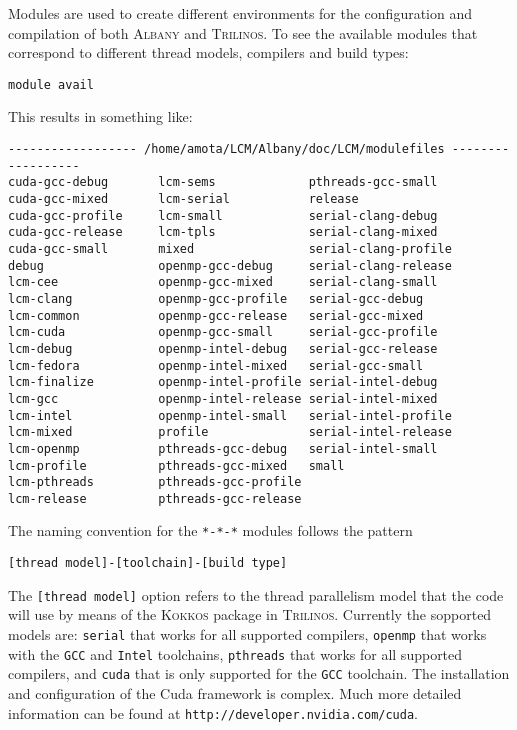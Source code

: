 \documentclass{article}
\newcommand{\trilinos}{\textsc{Trilinos}}
\newcommand{\albany}{\textsc{Albany}}
\newcommand{\kokkos}{\textsc{Kokkos}}
\begin{document}
Modules are used to create different environments for the
configuration and compilation of both \albany{} and \trilinos{}. To
see the available modules that correspond to different thread models,
compilers and build types:
\begin{verbatim}
module avail
\end{verbatim}
This results in something like:
\begin{verbatim}
------------------ /home/amota/LCM/Albany/doc/LCM/modulefiles ------------------
cuda-gcc-debug       lcm-sems             pthreads-gcc-small
cuda-gcc-mixed       lcm-serial           release
cuda-gcc-profile     lcm-small            serial-clang-debug
cuda-gcc-release     lcm-tpls             serial-clang-mixed
cuda-gcc-small       mixed                serial-clang-profile
debug                openmp-gcc-debug     serial-clang-release
lcm-cee              openmp-gcc-mixed     serial-clang-small
lcm-clang            openmp-gcc-profile   serial-gcc-debug
lcm-common           openmp-gcc-release   serial-gcc-mixed
lcm-cuda             openmp-gcc-small     serial-gcc-profile
lcm-debug            openmp-intel-debug   serial-gcc-release
lcm-fedora           openmp-intel-mixed   serial-gcc-small
lcm-finalize         openmp-intel-profile serial-intel-debug
lcm-gcc              openmp-intel-release serial-intel-mixed
lcm-intel            openmp-intel-small   serial-intel-profile
lcm-mixed            profile              serial-intel-release
lcm-openmp           pthreads-gcc-debug   serial-intel-small
lcm-profile          pthreads-gcc-mixed   small
lcm-pthreads         pthreads-gcc-profile
lcm-release          pthreads-gcc-release
\end{verbatim}
The naming convention for the \verb+*-*-*+ modules follows the pattern
\begin{verbatim}
[thread model]-[toolchain]-[build type]
\end{verbatim}
The \verb+[thread model]+ option refers to the thread parallelism
model that the code will use by means of the \kokkos{} package in
\trilinos{}. Currently the sopported models are: \verb+serial+ that
works for all supported compilers, \verb+openmp+ that works with the
\verb+GCC+ and \verb+Intel+ toolchains, \verb+pthreads+ that works for
all supported compilers, and \verb+cuda+ that is only supported for
the \verb+GCC+ toolchain. The installation and configuration of the
Cuda framework is complex. Much more detailed information can be found
at \verb+http://developer.nvidia.com/cuda+.
\end{document}
